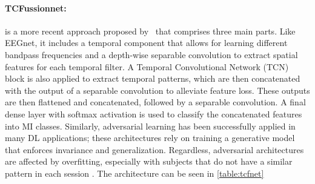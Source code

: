 \paragraph{TCFussionnet:} is a more recent approach proposed by~\cite{musallam2021electroencephalography} that comprises three main parts. Like EEGnet, it includes a temporal component that allows for learning different bandpass frequencies and a depth-wise separable convolution to extract spatial features for each temporal filter. A Temporal Convolutional Network (TCN) block is also applied to extract temporal patterns, which are then concatenated with the output of a separable convolution to alleviate feature loss. These outputs are then flattened and concatenated, followed by a separable convolution. A final dense layer with softmax activation is used to classify the concatenated features into MI classes. Similarly, adversarial learning has been successfully applied in many DL applications; these architectures rely on training a generative model that enforces invariance and generalization. Regardless, adversarial architectures are affected by overfitting, especially with subjects that do not have a similar pattern in each session \cite{ozdenizci2019adversarial}. The architecture can be seen in \cref{table:tcfnet}

